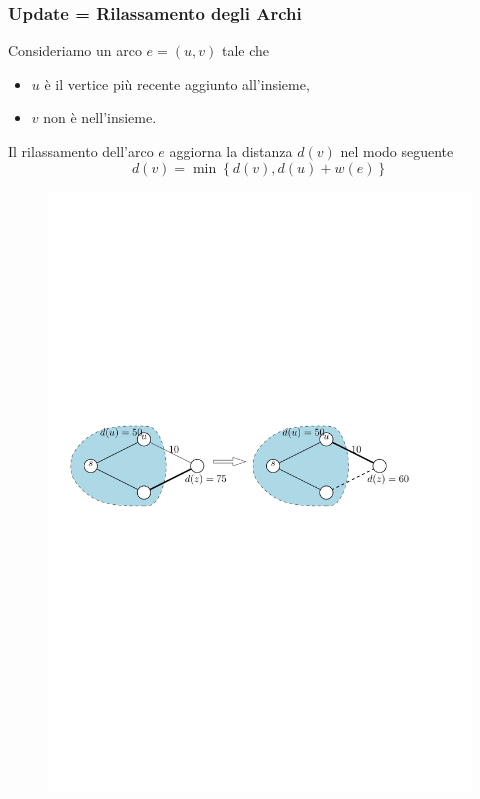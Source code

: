 \documentclass[10pt,xcolor=dvipsnames]{beamer}
\begin{document}
\begin{frame}
	\frametitle{Update = Rilassamento degli Archi}
	Consideriamo un arco $e=(u,v)$ tale che 
	\begin{itemize}
		\item $u$ è il vertice più recente aggiunto all'insieme,
		\item $v$ non è nell'insieme.
	\end{itemize}
	\vfill

	Il rilassamento dell'arco $e$ aggiorna la distanza $d(v)$ nel modo seguente
	$$ d(v)=\min\left\{ d(v),d(u)+w(e) \right\}$$
	\vfill

	\begin{figure}[h]
	\centering
		\includegraphics[scale=0.6]{dijkstra_relax.pdf}
	\end{figure}
\end{frame}
\end{document}
